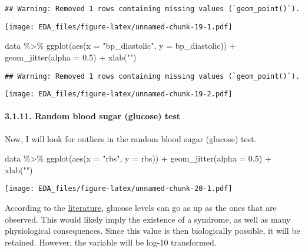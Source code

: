 \documentclass[
]{article}
\newenvironment{Shaded}{\begin{snugshade}}{\end{snugshade}}
\newcommand{\AttributeTok}[1]{\textcolor[rgb]{0.77,0.63,0.00}{#1}}
\newcommand{\FloatTok}[1]{\textcolor[rgb]{0.00,0.00,0.81}{#1}}
\newcommand{\FunctionTok}[1]{\textcolor[rgb]{0.00,0.00,0.00}{#1}}
\newcommand{\NormalTok}[1]{#1}
\newcommand{\SpecialCharTok}[1]{\textcolor[rgb]{0.00,0.00,0.00}{#1}}
\newcommand{\StringTok}[1]{\textcolor[rgb]{0.31,0.60,0.02}{#1}}
\begin{document}
\begin{verbatim}
## Warning: Removed 1 rows containing missing values (`geom_point()`).
\end{verbatim}

\texttt{[image: EDA\_files/figure-latex/unnamed-chunk-19-1.pdf]}

\begin{Shaded}
\begin{Highlighting}[]
\NormalTok{data }\SpecialCharTok{\%\textgreater{}\%} 
  \FunctionTok{ggplot}\NormalTok{(}\FunctionTok{aes}\NormalTok{(}\AttributeTok{x =} \StringTok{"bp\_diastolic"}\NormalTok{, }\AttributeTok{y =}\NormalTok{ bp\_diastolic)) }\SpecialCharTok{+}
  \FunctionTok{geom\_jitter}\NormalTok{(}\AttributeTok{alpha =} \FloatTok{0.5}\NormalTok{) }\SpecialCharTok{+}
  \FunctionTok{xlab}\NormalTok{(}\StringTok{""}\NormalTok{)}
\end{Highlighting}
\end{Shaded}

\begin{verbatim}
## Warning: Removed 1 rows containing missing values (`geom_point()`).
\end{verbatim}

\texttt{[image: EDA\_files/figure-latex/unnamed-chunk-19-2.pdf]}

\hypertarget{random-blood-sugar-glucose-test}{%
\paragraph{3.1.11. Random blood sugar (glucose)
test}\label{random-blood-sugar-glucose-test}}

Now, I will look for outliers in the random blood sugar (glucose) test.

\begin{Shaded}
\begin{Highlighting}[]
\NormalTok{data }\SpecialCharTok{\%\textgreater{}\%} 
  \FunctionTok{ggplot}\NormalTok{(}\FunctionTok{aes}\NormalTok{(}\AttributeTok{x =} \StringTok{"rbs"}\NormalTok{, }\AttributeTok{y =}\NormalTok{ rbs)) }\SpecialCharTok{+}
  \FunctionTok{geom\_jitter}\NormalTok{(}\AttributeTok{alpha =} \FloatTok{0.5}\NormalTok{) }\SpecialCharTok{+}
  \FunctionTok{xlab}\NormalTok{(}\StringTok{""}\NormalTok{)}
\end{Highlighting}
\end{Shaded}

\texttt{[image: EDA\_files/figure-latex/unnamed-chunk-20-1.pdf]}

According to the
\href{https://www.mayoclinic.org/diseases-conditions/diabetic-coma/symptoms-causes/syc-20371475}{literature},
glucose levels can go as up as the ones that are observed. This would
likely imply the existence of a syndrome, as well as many physiological
consequences. Since this value is then biologically possible, it will be
retained. However, the variable will be log-10 transformed.
\end{document}
